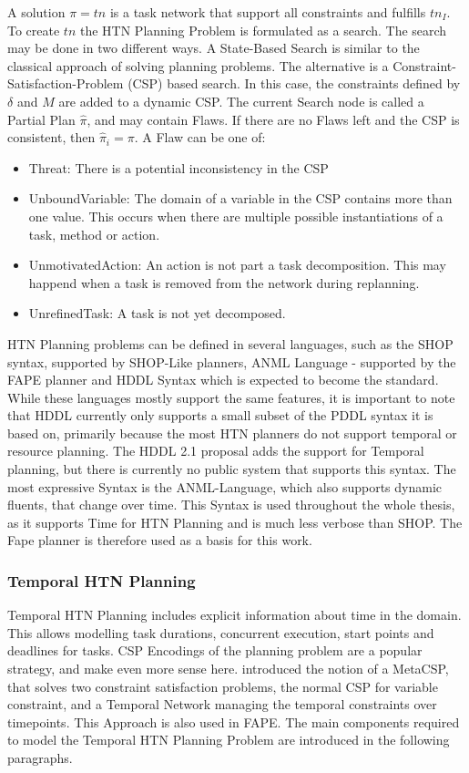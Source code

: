 A solution $\pi = tn$ is a task network that support all constraints and fulfills $tn_I$.
To create $tn$ the HTN Planning Problem is formulated as a search.
The search may be done in two different ways.
A State-Based Search is similar to the classical approach of solving planning problems.
The alternative is a Constraint-Satisfaction-Problem (CSP) based search.
In this case, the constraints defined by $\delta$ and $M$ are added to a dynamic CSP.
The current Search node is called a Partial Plan $\hat{\pi}$, and may contain Flaws.
If there are no Flaws left and the CSP is consistent, then $\hat{\pi}_i = \pi$.
A Flaw can be one of:
\begin{itemize}
  \item Threat: There is a potential inconsistency in the CSP
  \item UnboundVariable: The domain of a variable in the CSP contains more than one value. This occurs when there are multiple possible instantiations of a task, method or action.
  \item UnmotivatedAction: An action is not part a task decomposition. This may happend when a task is removed from the network during replanning.
  \item UnrefinedTask: A task is not yet decomposed.
\end{itemize}

HTN Planning problems can be defined in several languages, such as the SHOP syntax, supported by SHOP-Like planners, ANML Language - supported by the FAPE planner and HDDL Syntax which is expected to become the standard.
While these languages mostly support the same features, it is important to note that HDDL currently only supports a small subset of the PDDL syntax it is based on, primarily because the most HTN planners do not support temporal or resource planning.
The HDDL 2.1 proposal adds the support for Temporal planning, but there is currently no public system that supports this syntax.
The most expressive Syntax is the ANML-Language, which also supports dynamic fluents, that change over time.
This Syntax is used throughout the whole thesis, as it supports Time for HTN Planning and is much less verbose than SHOP.
The Fape planner is therefore used as a basis for this work.

\subsubsection{Temporal HTN Planning}\label{sec:temporal-htn-planning}

Temporal HTN Planning includes explicit information about time in the domain.
This allows modelling task durations, concurrent execution, start points and deadlines for tasks.
CSP Encodings of the planning problem are a popular strategy, and make even more sense here.
\cite{stockHierarchicalHybridPlanning2015} introduced the notion of a MetaCSP, that solves two constraint satisfaction problems, the normal CSP for variable constraint, and a Temporal Network managing the temporal constraints over timepoints.
This Approach is also used in FAPE.
The main components required to model the Temporal HTN Planning Problem are introduced in the following paragraphs. 

